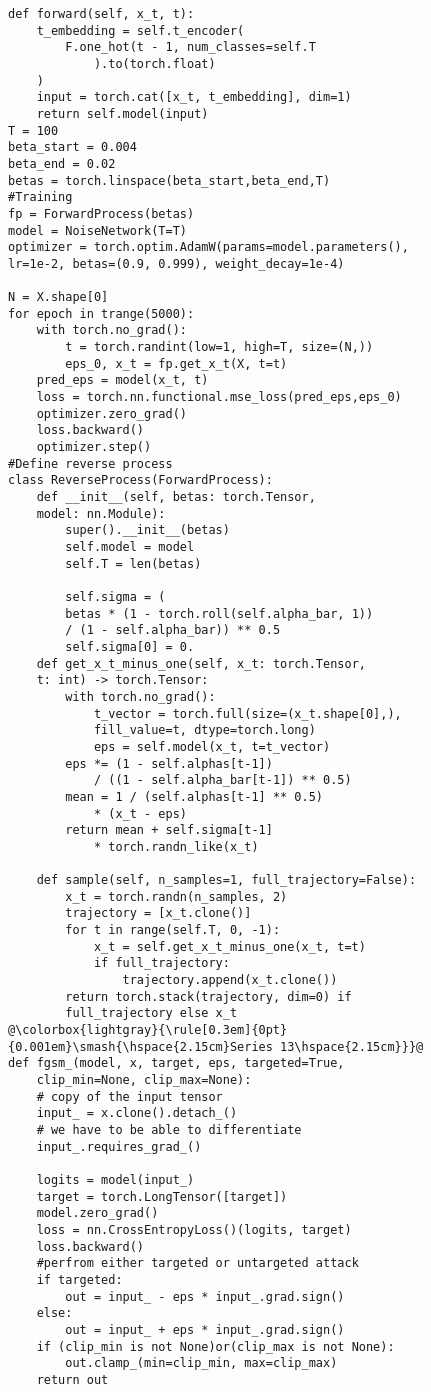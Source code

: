\begin{lstlisting}[style=mypython]
def forward(self, x_t, t):
    t_embedding = self.t_encoder(
        F.one_hot(t - 1, num_classes=self.T
            ).to(torch.float)
    )
    input = torch.cat([x_t, t_embedding], dim=1)
    return self.model(input)
T = 100
beta_start = 0.004
beta_end = 0.02
betas = torch.linspace(beta_start,beta_end,T)
#Training
fp = ForwardProcess(betas)
model = NoiseNetwork(T=T)
optimizer = torch.optim.AdamW(params=model.parameters(),
lr=1e-2, betas=(0.9, 0.999), weight_decay=1e-4)

N = X.shape[0]
for epoch in trange(5000):
    with torch.no_grad():
        t = torch.randint(low=1, high=T, size=(N,))
        eps_0, x_t = fp.get_x_t(X, t=t)
    pred_eps = model(x_t, t)
    loss = torch.nn.functional.mse_loss(pred_eps,eps_0)
    optimizer.zero_grad()
    loss.backward()
    optimizer.step()
#Define reverse process
class ReverseProcess(ForwardProcess):
    def __init__(self, betas: torch.Tensor,
    model: nn.Module):
        super().__init__(betas)
        self.model = model
        self.T = len(betas)

        self.sigma = (
        betas * (1 - torch.roll(self.alpha_bar, 1)) 
        / (1 - self.alpha_bar)) ** 0.5
        self.sigma[0] = 0. 
    def get_x_t_minus_one(self, x_t: torch.Tensor,
    t: int) -> torch.Tensor:
        with torch.no_grad():
            t_vector = torch.full(size=(x_t.shape[0],),
            fill_value=t, dtype=torch.long)
            eps = self.model(x_t, t=t_vector)
        eps *= (1 - self.alphas[t-1]) 
            / ((1 - self.alpha_bar[t-1]) ** 0.5)
        mean = 1 / (self.alphas[t-1] ** 0.5) 
            * (x_t - eps)
        return mean + self.sigma[t-1] 
            * torch.randn_like(x_t)

    def sample(self, n_samples=1, full_trajectory=False):
        x_t = torch.randn(n_samples, 2)
        trajectory = [x_t.clone()]
        for t in range(self.T, 0, -1):
            x_t = self.get_x_t_minus_one(x_t, t=t)
            if full_trajectory:
                trajectory.append(x_t.clone())
        return torch.stack(trajectory, dim=0) if
        full_trajectory else x_t
@\colorbox{lightgray}{\rule[0.3em]{0pt}{0.001em}\smash{\hspace{2.15cm}Series 13\hspace{2.15cm}}}@
def fgsm_(model, x, target, eps, targeted=True,
    clip_min=None, clip_max=None):
    # copy of the input tensor
    input_ = x.clone().detach_()
    # we have to be able to differentiate
    input_.requires_grad_()

    logits = model(input_)
    target = torch.LongTensor([target])
    model.zero_grad()
    loss = nn.CrossEntropyLoss()(logits, target)
    loss.backward()
    #perfrom either targeted or untargeted attack
    if targeted:
        out = input_ - eps * input_.grad.sign()
    else:
        out = input_ + eps * input_.grad.sign()
    if (clip_min is not None)or(clip_max is not None):
        out.clamp_(min=clip_min, max=clip_max)
    return out


\end{lstlisting}
